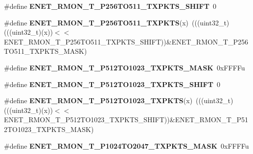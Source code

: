 \begin{DoxyCompactItemize}
\item 
\#define {\bfseries E\+N\+E\+T\+\_\+\+R\+M\+O\+N\+\_\+\+T\+\_\+\+P256\+T\+O511\+\_\+\+T\+X\+P\+K\+T\+S\+\_\+\+S\+H\+I\+FT}~0\hypertarget{group__ENET__Register__Masks_gae24403acde1f82a26d37e32743c259cf}{}\label{group__ENET__Register__Masks_gae24403acde1f82a26d37e32743c259cf}

\item 
\#define {\bfseries E\+N\+E\+T\+\_\+\+R\+M\+O\+N\+\_\+\+T\+\_\+\+P256\+T\+O511\+\_\+\+T\+X\+P\+K\+TS}(x)~(((uint32\+\_\+t)(((uint32\+\_\+t)(x))$<$$<$E\+N\+E\+T\+\_\+\+R\+M\+O\+N\+\_\+\+T\+\_\+\+P256\+T\+O511\+\_\+\+T\+X\+P\+K\+T\+S\+\_\+\+S\+H\+I\+FT))\&E\+N\+E\+T\+\_\+\+R\+M\+O\+N\+\_\+\+T\+\_\+\+P256\+T\+O511\+\_\+\+T\+X\+P\+K\+T\+S\+\_\+\+M\+A\+SK)\hypertarget{group__ENET__Register__Masks_gab00f7d9c011f220e5022eda482c3d411}{}\label{group__ENET__Register__Masks_gab00f7d9c011f220e5022eda482c3d411}

\item 
\#define {\bfseries E\+N\+E\+T\+\_\+\+R\+M\+O\+N\+\_\+\+T\+\_\+\+P512\+T\+O1023\+\_\+\+T\+X\+P\+K\+T\+S\+\_\+\+M\+A\+SK}~0x\+F\+F\+F\+Fu\hypertarget{group__ENET__Register__Masks_gaf14272bdf0f12949bf600b571553adcb}{}\label{group__ENET__Register__Masks_gaf14272bdf0f12949bf600b571553adcb}

\item 
\#define {\bfseries E\+N\+E\+T\+\_\+\+R\+M\+O\+N\+\_\+\+T\+\_\+\+P512\+T\+O1023\+\_\+\+T\+X\+P\+K\+T\+S\+\_\+\+S\+H\+I\+FT}~0\hypertarget{group__ENET__Register__Masks_ga4a580b8a12cf238b78636beddc069555}{}\label{group__ENET__Register__Masks_ga4a580b8a12cf238b78636beddc069555}

\item 
\#define {\bfseries E\+N\+E\+T\+\_\+\+R\+M\+O\+N\+\_\+\+T\+\_\+\+P512\+T\+O1023\+\_\+\+T\+X\+P\+K\+TS}(x)~(((uint32\+\_\+t)(((uint32\+\_\+t)(x))$<$$<$E\+N\+E\+T\+\_\+\+R\+M\+O\+N\+\_\+\+T\+\_\+\+P512\+T\+O1023\+\_\+\+T\+X\+P\+K\+T\+S\+\_\+\+S\+H\+I\+FT))\&E\+N\+E\+T\+\_\+\+R\+M\+O\+N\+\_\+\+T\+\_\+\+P512\+T\+O1023\+\_\+\+T\+X\+P\+K\+T\+S\+\_\+\+M\+A\+SK)\hypertarget{group__ENET__Register__Masks_ga22c752d3df4c9638eae841367dcd8e04}{}\label{group__ENET__Register__Masks_ga22c752d3df4c9638eae841367dcd8e04}

\item 
\#define {\bfseries E\+N\+E\+T\+\_\+\+R\+M\+O\+N\+\_\+\+T\+\_\+\+P1024\+T\+O2047\+\_\+\+T\+X\+P\+K\+T\+S\+\_\+\+M\+A\+SK}~0x\+F\+F\+F\+Fu\hypertarget{group__ENET__Register__Masks_ga874fdbd030f1c4a977a7f989cb316a6c}{}\label{group__ENET__Register__Masks_ga874fdbd030f1c4a977a7f989cb316a6c}


\end{DoxyCompactItemize}
